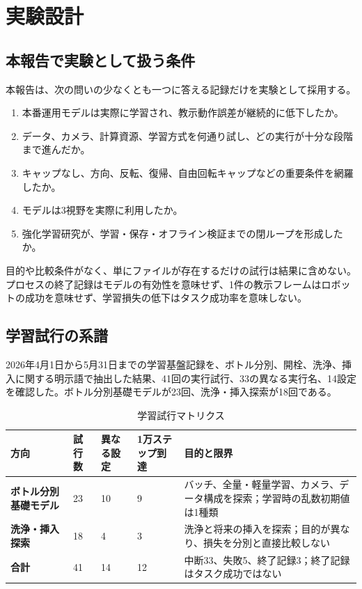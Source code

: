 \chapter{実験設計}

\section{本報告で実験として扱う条件}

本報告は、次の問いの少なくとも一つに答える記録だけを実験として採用する。

\begin{enumerate}
  \item 本番運用モデルは実際に学習され、教示動作誤差が継続的に低下したか。
  \item データ、カメラ、計算資源、学習方式を何通り試し、どの実行が十分な段階まで進んだか。
  \item キャップなし、方向、反転、復帰、自由回転キャップなどの重要条件を網羅したか。
  \item モデルは3視野を実際に利用したか。
  \item 強化学習研究が、学習・保存・オフライン検証までの閉ループを形成したか。
\end{enumerate}

目的や比較条件がなく、単にファイルが存在するだけの試行は結果に含めない。プロセスの終了記録はモデルの有効性を意味せず、1件の教示フレームはロボットの成功を意味せず、学習損失の低下はタスク成功率を意味しない。

\section{学習試行の系譜}

2026年4月1日から5月31日までの学習基盤記録を、ボトル分別、開栓、洗浄、挿入に関する明示語で抽出した結果、41回の実行試行、33の異なる実行名、14設定を確認した。ボトル分別基礎モデルが23回、洗浄・挿入探索が18回である。


\begin{table}[H]
\centering
\caption{学習試行マトリクス}
\begin{tabularx}{\textwidth}{>{\bfseries}p{34mm}p{23mm}p{29mm}p{28mm}X}
\toprule
方向 & 試行数 & 異なる設定 & 1万ステップ到達 & 目的と限界\\
\midrule
ボトル分別基礎モデル & 23 & 10 & 9 & バッチ、全量・軽量学習、カメラ、データ構成を探索；学習時の乱数初期値は1種類\\
洗浄・挿入探索 & 18 & 4 & 3 & 洗浄と将来の挿入を探索；目的が異なり、損失を分別と直接比較しない\\
合計 & 41 & 14 & 12 & 中断33、失敗5、終了記録3；終了記録はタスク成功ではない\\
\bottomrule
\end{tabularx}
\end{table}

